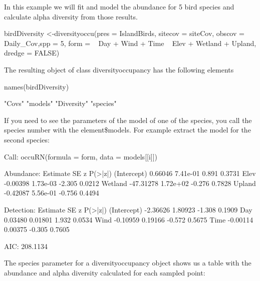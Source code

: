 \documentclass[article]{jss}
\begin{document}
In this example we will fit and model the abundance for 5 bird species
and calculate alpha diversity from those results.

\begin{CodeChunk}
\begin{CodeInput}
birdDiversity <-diversityoccu(pres = IslandBirds, sitecov = siteCov,
obscov = Daily_Cov,spp =  5, form = ~ Day + Wind + Time ~ Elev + Wetland + Upland, dredge = FALSE)
\end{CodeInput}
\end{CodeChunk}

The resulting object of class diversityoccupancy has the following
elements

\begin{CodeChunk}
\begin{CodeInput}
names(birdDiversity)
\end{CodeInput}
\begin{CodeOutput}
[1] "Covs"      "models"    "Diversity" "species"  
\end{CodeOutput}
\end{CodeChunk}

If you need to see the parameters of the model of one of the species,
you call the species number with the element\$models. For example
extract the model for the second species:

\begin{CodeChunk}
\begin{CodeOutput}

Call:
occuRN(formula = form, data = models[[i]])

Abundance:
             Estimate       SE      z P(>|z|)
(Intercept)   0.66046 7.41e-01  0.891  0.3731
Elev         -0.00398 1.73e-03 -2.305  0.0212
Wetland     -47.31278 1.72e+02 -0.276  0.7828
Upland       -0.42087 5.56e-01 -0.756  0.4494

Detection:
            Estimate      SE      z P(>|z|)
(Intercept) -2.36626 1.80923 -1.308  0.1909
Day          0.03480 0.01801  1.932  0.0534
Wind        -0.10959 0.19166 -0.572  0.5675
Time        -0.00114 0.00375 -0.305  0.7605

AIC: 208.1134 
\end{CodeOutput}
\end{CodeChunk}

The species parameter for a diversityoccupancy object shows us a table with the abundance and alpha diversity calculated for each sampled point:
\end{document}
